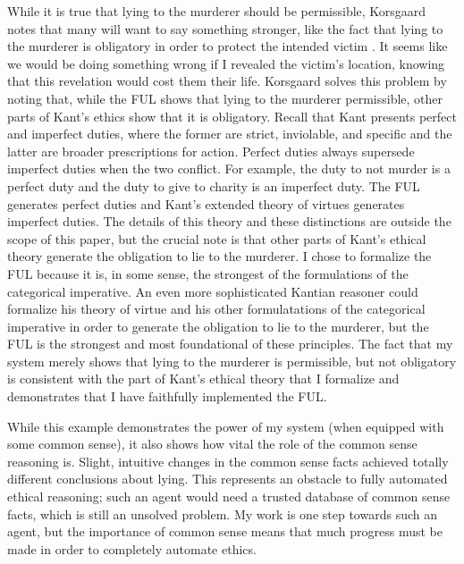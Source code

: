 \begin{isabellebody}
\begin{isamarkuptext}
While it is true that lying to the murderer should be permissible, Korsgaard notes that many will want
to say something stronger, like the fact that lying to the murderer is obligatory in order to protect
the intended victim \citep[15]{KorsgaardRTL}. It seems like we would be doing something wrong if I revealed the victim's
location, knowing that this revelation would cost them their life. Korsgaard solves this problem by 
noting that, while the FUL shows that lying to the murderer permissible, other parts of Kant's ethics
show that it is obligatory. Recall that Kant presents perfect and imperfect duties,
where the former are strict, inviolable, and specific and the latter are broader prescriptions for action.
Perfect duties always supersede imperfect duties when the two conflict.
For example, the duty to not murder is a perfect duty and the duty to give to charity is an imperfect duty. 
The FUL generates perfect duties and Kant's extended theory of virtues generates imperfect duties. The details
of this theory and these distinctions are outside the scope of this paper, but the crucial note is that 
other parts of Kant's ethical theory generate the obligation to lie to the murderer. I chose
to formalize the FUL because it is, in some sense, the strongest of the formulations of the categorical
imperative. An even more sophisticated Kantian reasoner could formalize his theory of virtue and his
other formulatations of the categorical imperative in order to generate the obligation to lie to the murderer, 
but the FUL is the strongest and most foundational of these principles. The fact that my system merely
shows that lying to the murderer is permissible, but not obligatory is consistent with the part of 
Kant's ethical theory that I formalize and demonstrates that I have faithfully implemented the FUL.%
\end{isamarkuptext}\isamarkuptrue%
%
\begin{isamarkuptext}%
While this example demonstrates the power of my system (when equipped with some common sense), it 
also shows how vital the role of the common sense reasoning is. Slight, intuitive changes in the common
sense facts achieved totally different conclusions about lying. This represents an obstacle to 
fully automated ethical reasoning; such an agent would need a trusted database of common 
sense facts, which is still an unsolved problem. My work is one step towards such an agent, but the 
importance of common sense means that much progress must be made in order to completely automate ethics.


\end{isamarkuptext}
\end{isabellebody}
